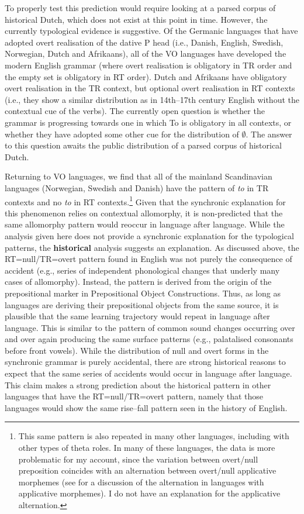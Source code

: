 	To properly test this prediction would require looking at a parsed corpus of historical Dutch, which does not exist at this point in time. However, the currently typological evidence is suggestive. Of the Germanic languages that have adopted overt realisation of the dative P head (i.e., Danish, English, Swedish, Norwegian, Dutch and Afrikaans), all of the VO languages have developed the modern English grammar (where overt realisation is obligatory in TR order and the empty set is obligatory in RT order). Dutch and Afrikaans have obligatory overt realisation in the TR context, but optional overt realisation in RT contexts (i.e., they show a similar distribution as in 14th--17th century English without the contextual cue of the verbs). The currently open question is whether the grammar is progressing towards one in which To is obligatory in all contexts, or whether they have adopted some other cue for the distribution of $\emptyset$. The answer to this question awaits the public distribution of a parsed corpus of historical Dutch.

	Returning to VO languages, we find that all of the mainland Scandinavian languages (Norwegian, Swedish and Danish) have the pattern of \textit{to} in TR contexts and no \textit{to} in RT contexts.\footnote{This same pattern is also repeated in many other languages, including with other types of theta roles. In many of these languages, the data is more problematic for my account, since the variation between overt/null preposition coincides with an alternation between overt/null applicative morphemes (see \citet{Baker.1988} for a discussion of the alternation in languages with applicative morphemes). I do not have an explanation for the applicative alternation.} Given that the synchronic explanation for this phenomenon relies on contextual allomorphy, it is non-predicted that the same allomorphy pattern would reoccur in language after language. While the analysis given here does not provide a synchronic explanation for the typological patterns, the \textbf{historical} analysis suggests an explanation. As discussed above, the RT=null/TR=overt pattern found in English was not purely the consequence of accident (e.g., series of independent phonological changes that underly many cases of allomorphy). Instead, the pattern is derived from the origin of the prepositional marker in Prepositional Object Constructions. Thus, as long as languages are deriving their prepositional objects from the same source, it is plausible that the same learning trajectory would repeat in language after language. This is similar to the pattern of common sound changes occurring over and over again producing the same surface patterns (e.g., palatalised consonants before front vowels). While the distribution of null and overt forms in the synchronic grammar is purely accidental, there are strong historical reasons to expect that the same series of accidents would occur in language after language. This claim makes a strong prediction about the historical pattern in other languages that have the RT=null/TR=overt pattern, namely that those languages would show the same rise--fall pattern seen in the history of English.


